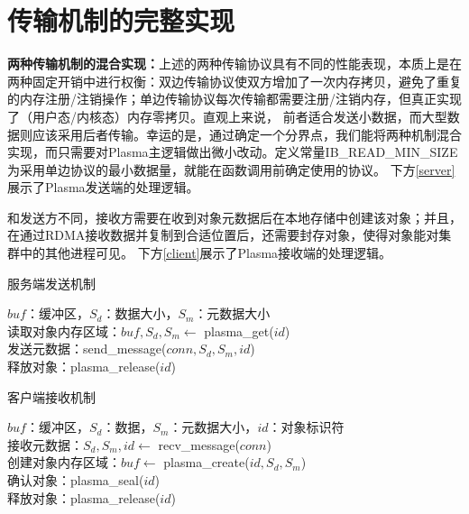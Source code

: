 \section{传输机制的完整实现}

\textbf{两种传输机制的混合实现：}上述的两种传输协议具有不同的性能表现，本质上是在两种固定开销中进行权衡：双边传输协议使双方增加了一次内存拷贝，避免了重复的内存注册/注销操作；单边传输协议每次传输都需要注册/注销内存，但真正实现了（用户态/内核态）内存零拷贝。直观上来说，
前者适合发送小数据，而大型数据则应该采用后者传输。幸运的是，通过确定一个分界点，我们能将两种机制混合实现，而只需要对Plasma主逻辑做出微小改动。定义常量IB\_READ\_MIN\_SIZE为采用单边协议的最小数据量，就能在函数调用前确定使用的协议。
下方\autoref{server}展示了Plasma发送端的处理逻辑。

和发送方不同，接收方需要在收到对象元数据后在本地存储中创建该对象；并且，在通过RDMA接收数据并复制到合适位置后，还需要封存对象，使得对象能对集群中的其他进程可见。
下方\autoref{client}展示了Plasma接收端的处理逻辑。

\begin{algorithm}[H]
	\caption{服务端发送机制}\label{server}
	$buf$：缓冲区，$S_d$：数据大小，$S_m$：元数据大小 \\
	读取对象内存区域：$buf, S_d, S_m \leftarrow$ plasma\_get($id$) \\
	发送元数据：send\_message($conn, S_d, S_m, id$) \\
	释放对象：plasma\_release($id$)
\end{algorithm}

\begin{algorithm}[H]
	\caption{客户端接收机制}\label{client}
	$buf$：缓冲区，$S_d$：数据，$S_m$：元数据大小，$id$：对象标识符 \\
	接收元数据：$S_d, S_m, id \leftarrow$ recv\_message($conn$) \\
	创建对象内存区域：$buf \leftarrow$ plasma\_create($id, S_d, S_m$) \\
	确认对象：plasma\_seal($id$) \\
	释放对象：plasma\_release($id$) \\
\end{algorithm}

